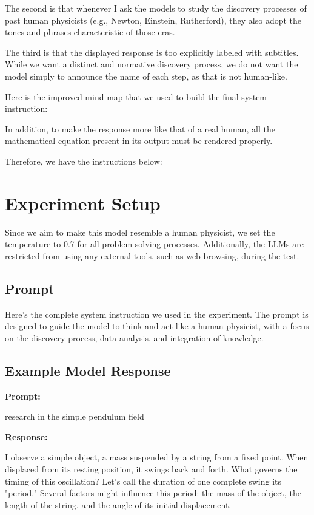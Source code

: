 \documentclass[12pt]{article}
\begin{document}
The second is that whenever I ask the models to study the discovery processes of past human physicists (e.g., Newton, Einstein, Rutherford), they also adopt the tones and phrases characteristic of those eras.

The third is that the displayed response is too explicitly labeled with subtitles. While we want a distinct and normative discovery process, we do not want the model simply to announce the name of each step, as that is not human-like.
\par
\bigskip
Here is the improved mind map that we used to build the final system instruction:

\par
\bigskip
In addition, to make the response more like that of a real human, all the mathematical equation present in its output must be rendered properly.

Therefore, we have the instructions below:


\section{Experiment Setup}
Since we aim to make this model resemble a human physicist, we set the temperature to 0.7 for all problem-solving processes. Additionally, the LLMs are restricted from using any external tools, such as web browsing, during the test.
\subsection{Prompt}
Here's the complete system instruction we used in the experiment. The prompt is designed to guide the model to think and act like a human physicist, with a focus on the discovery process, data analysis, and integration of knowledge.


\subsection{Example Model Response}

\textbf{Prompt:}

research in the simple pendulum field
\par
\bigskip
\textbf{Response:}

I observe a simple object, a mass suspended by a string from a fixed point. When displaced from its resting position, it swings back and forth. What governs the timing of this oscillation? Let's call the duration of one complete swing its "period." Several factors might influence this period: the mass of the object, the length of the string, and the angle of its initial displacement.
\end{document}
